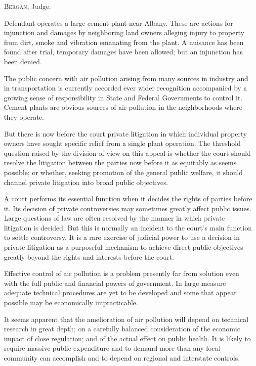 

\opinion \textsc{Bergan}, Judge.

Defendant operates a large cement plant near Albany. These are actions for
injunction and damages by neighboring land owners alleging injury to property
from dirt, smoke and vibration emanating from the plant. A nuisance has been
found after trial, temporary damages have been allowed; but an injunction has
been denied.

The public concern with air pollution arising from many sources in industry and
in transportation is currently accorded ever wider recognition accompanied by a
growing sense of responsibility in State and Federal Governments to control it.
Cement plants are obvious sources of air pollution in the neighborhoods where
they operate.

But there is now before the court private litigation in which individual
property owners have sought specific relief from a single plant operation. The
threshold question raised by the division of view on this appeal is whether the
court should resolve the litigation between the parties now before it as
equitably as seems possible; or whether, seeking promotion of the general public
welfare, it should channel private litigation into broad public objectives.

A court performs its essential function when it decides the rights of parties
before it. Its decision of private controversies may sometimes greatly affect
public issues. Large questions of law are often resolved by the manner in which
private litigation is decided. But this is normally an incident to the court's
main function to settle controversy. It is a rare exercise of judicial power to
use a decision in private litigation as a purposeful mechanism to achieve direct
public objectives greatly beyond the rights and interests before the court.

Effective control of air pollution is a problem presently far from solution even
with the full public and financial powers of government. In large measure
adequate technical procedures are yet to be developed and some that appear
possible may be economically impracticable.

It seems apparent that the amelioration of air pollution will depend on
technical research in great depth; on a carefully balanced consideration of the
economic impact of close regulation; and of the actual effect on public health.
It is likely to require massive public expenditure and to demand more than any
local community can accomplish and to depend on regional and interstate
controls.

